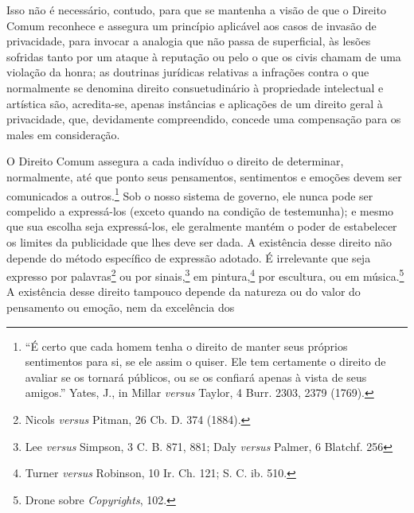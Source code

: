 Isso não é necessário, contudo, para que se mantenha a visão de que o
Direito Comum reconhece e assegura um princípio aplicável aos casos de
invasão de privacidade, para invocar a analogia que não passa de
superficial, às lesões sofridas tanto por um ataque à reputação ou pelo
o que os civis chamam de uma violação da honra; as doutrinas jurídicas
relativas a infrações contra o que normalmente se denomina direito
consuetudinário à propriedade intelectual e artística são, acredita-se,
apenas instâncias e aplicações de um direito geral à privacidade, que,
devidamente compreendido, concede uma compensação para os males em
consideração.

O Direito Comum assegura a cada indivíduo o direito de determinar,
normalmente, até que ponto seus pensamentos, sentimentos e emoções devem
ser comunicados a outros.\footnote{``É certo que cada homem tenha o
  direito de manter seus próprios sentimentos para si, se ele assim o
  quiser. Ele tem certamente o direito de avaliar se os tornará
  públicos, ou se os confiará apenas à vista de seus amigos.'' Yates,
  J., in Millar \emph{versus} Taylor, 4 Burr. 2303, 2379 (1769).} Sob o
nosso sistema de governo, ele nunca pode ser compelido a expressá-los
(exceto quando na condição de testemunha); e mesmo que sua escolha seja
expressá-los, ele geralmente mantém o poder de estabelecer os limites da
publicidade que lhes deve ser dada. A existência desse direito não
depende do método específico de expressão adotado. É irrelevante que
seja expresso por palavras\footnote{Nicols \emph{versus} Pitman, 26 Cb.
  D. 374 (1884).} ou por sinais,\footnote{Lee \emph{versus} Simpson, 3
  C. B. 871, 881; Daly \emph{versus} Palmer, 6 Blatchf. 256} em
pintura,\footnote{Turner \emph{versus} Robinson, 10 Ir. Ch. 121; S. C.
  ib. 510.} por escultura, ou em música.\footnote{Drone sobre
  \emph{Copyrights}, 102.} A existência desse direito tampouco depende
da natureza ou do valor do pensamento ou emoção, nem da excelência dos
